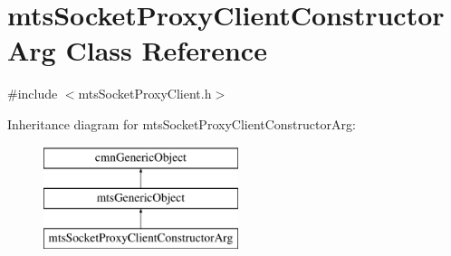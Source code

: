 \hypertarget{classmts_socket_proxy_client_constructor_arg}{}\section{mts\+Socket\+Proxy\+Client\+Constructor\+Arg Class Reference}
\label{classmts_socket_proxy_client_constructor_arg}


{\ttfamily \#include $<$mts\+Socket\+Proxy\+Client.\+h$>$}

Inheritance diagram for mts\+Socket\+Proxy\+Client\+Constructor\+Arg\+:\begin{figure}[H]
\begin{center}
\leavevmode
\includegraphics[height=3.000000cm]{d2/dca/classmts_socket_proxy_client_constructor_arg}
\end{center}
\end{figure}
